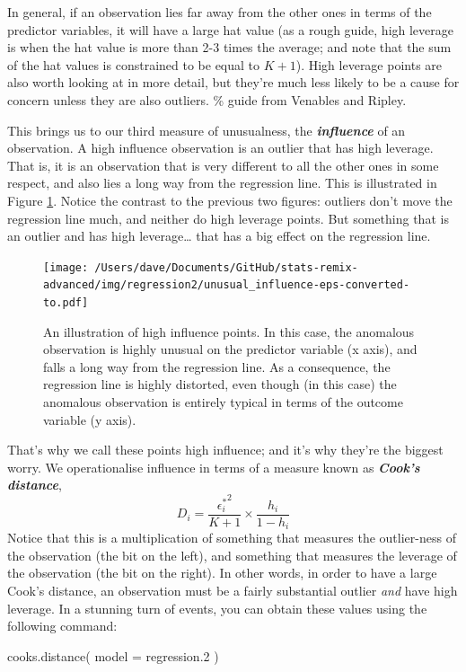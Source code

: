 \documentclass[
]{book}
\newenvironment{Shaded}{\begin{snugshade}}{\end{snugshade}}
\newcommand{\AttributeTok}[1]{\textcolor[rgb]{0.77,0.63,0.00}{#1}}
\newcommand{\FloatTok}[1]{\textcolor[rgb]{0.00,0.00,0.81}{#1}}
\newcommand{\FunctionTok}[1]{\textcolor[rgb]{0.00,0.00,0.00}{#1}}
\newcommand{\NormalTok}[1]{#1}
\begin{document}
In general, if an observation lies far away from the other ones in terms of the predictor variables, it will have a large hat value (as a rough guide, high leverage is when the hat value is more than 2-3 times the average; and note that the sum of the hat values is constrained to be equal to \(K+1\)). High leverage points are also worth looking at in more detail, but they're much less likely to be a cause for concern unless they are also outliers. \% guide from Venables and Ripley.

This brings us to our third measure of unusualness, the \textbf{\emph{influence}} of an observation. A high influence observation is an outlier that has high leverage. That is, it is an observation that is very different to all the other ones in some respect, and also lies a long way from the regression line. This is illustrated in Figure \ref{fig:influence}. Notice the contrast to the previous two figures: outliers don't move the regression line much, and neither do high leverage points. But something that is an outlier and has high leverage\ldots{} that has a big effect on the regression line.

\begin{figure}
\centering
\texttt{[image: /Users/dave/Documents/GitHub/stats-remix-advanced/img/regression2/unusual\_influence-eps-converted-to.pdf]}
\caption{\label{fig:influence}An illustration of high influence points. In this case, the anomalous observation is highly unusual on the predictor variable (x axis), and falls a long way from the regression line. As a consequence, the regression line is highly distorted, even though (in this case) the anomalous observation is entirely typical in terms of the outcome variable (y axis).}
\end{figure}

That's why we call these points high influence; and it's why they're the biggest worry. We operationalise influence in terms of a measure known as \textbf{\emph{Cook's distance}},
\[
D_i = \frac{{\epsilon_i^*}^2 }{K+1} \times \frac{h_i}{1-h_i}
\]
Notice that this is a multiplication of something that measures the outlier-ness of the observation (the bit on the left), and something that measures the leverage of the observation (the bit on the right). In other words, in order to have a large Cook's distance, an observation must be a fairly substantial outlier \emph{and} have high leverage. In a stunning turn of events, you can obtain these values using the following command:

\begin{Shaded}
\begin{Highlighting}[]
\FunctionTok{cooks.distance}\NormalTok{( }\AttributeTok{model =}\NormalTok{ regression}\FloatTok{.2}\NormalTok{ )}
\end{Highlighting}
\end{Shaded}
\end{document}
